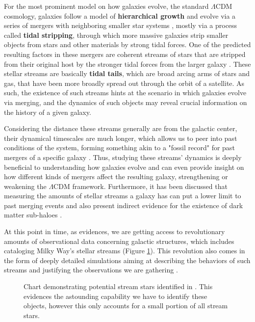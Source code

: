 \documentclass[linenumbers,trackchanges,twocolumn]{aastex7}
\begin{document}
For the most prominent model on how galaxies evolve, the standard $\Lambda$CDM cosmology, galaxies follow a model of \textbf{hierarchical growth} and evolve via a series of mergers with neighboring smaller star systems \citep{Johnston2008-bz}, mostly via a process called \textbf{tidal stripping}, through which more massive galaxies strip smaller objects from stars and other materials by strong tidal forces. One of the predicted resulting factors in these mergers are coherent streams of stars that are stripped from their original host by the stronger tidal forces from the larger galaxy \citep{Jensen2021-mw}. These stellar streams are basically \textbf{tidal tails}, which are broad arcing arms of stars and gas, that have been more broadly spread out through the orbit of a satellite. As such, the existence of such streams hints at the scenario in which galaxies evolve via merging, and the dynamics of such objects may reveal crucial information on the history of a given galaxy.

Considering the distance these streams generally are from the galactic center, their dynamical timescales are much longer, which allows us to peer into past conditions of the system, forming something akin to a "fossil record" for past mergers of a specific galaxy \citep{Johnston1996-uv}. Thus, studying these streams' dynamics is deeply beneficial to understanding how galaxies evolve and can even provide insight on how different kinds of mergers affect the resulting galaxy, strengthening or weakening the $\Lambda$CDM framework. Furthermore, it has been discussed that measuring the amounts of stellar streams a galaxy has can put a lower limit to past merging events and also present indirect evidence for the existence of dark matter sub-haloes \citep{Malhan2018-mh}.

At this point in time, as \cite{Jensen2021-mw} evidences, we are getting access to revolutionary amounts of observational data concerning galactic structures, which includes cataloging Milky Way's stellar streams (Figure \ref{fig:general}). This revolution also comes in the form of deeply detailed simulations aiming at describing the behaviors of such streams and justifying the observations we are gathering \citep{Choi2007-lc}.

\begin{figure}[ht!]
\caption{Chart demonstrating potential stream stars identified in \citep{Malhan2018-mh}. This evidences the astounding capability we have to identify these objects, however this only accounts for a small portion of all stream stars.}
\label{fig:general}
\end{figure}
\end{document}
